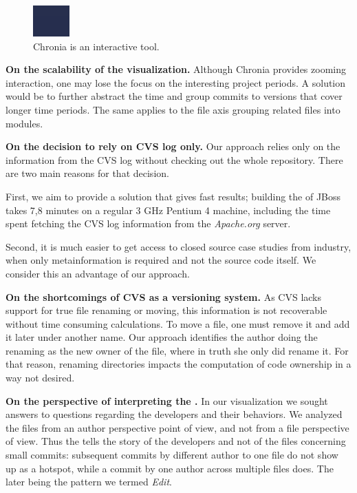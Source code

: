 \documentclass[10pt]{book}
\begin{document}
\begin{figure}[htbp]
\begin{center}
\includegraphics{chronia}
\caption{Chronia is an interactive tool.}
\label{fig:chronia}
\end{center}
\end{figure}

\textbf{On the scalability of the visualization.} Although Chronia provides zooming interaction, one may lose the focus on the interesting project periods. A solution would be to further abstract the time and group commits to versions that cover longer time periods. The same applies to the file axis grouping related files into modules.

\textbf{On the decision to rely on CVS log only.} Our approach relies only on the information from the CVS log without checking out the whole repository. There are two main reasons for that decision.

First, we aim to provide a solution that gives fast results; \eg building the \omap of JBoss takes 7,8 minutes on a regular 3 GHz Pentium 4 machine, including the time spent fetching the CVS log information from the \textit{Apache.org} server.

Second, it is much easier to get access to closed source case studies from industry, when only metainformation is required and not the source code itself. We consider this an advantage of our approach.

\textbf{On the shortcomings of CVS as a versioning system.} As CVS lacks support for true file renaming or moving, this information is not recoverable without time consuming calculations. To move a file, one must remove it and add it later under another name. Our approach identifies the author doing the renaming as the new owner of the file, where in truth she only did rename it. For that reason, renaming directories impacts the computation of code ownership in a way not desired.

\textbf{On the perspective of interpreting the \omap.} In our visualization we sought answers to questions regarding the developers and their behaviors. We analyzed the files from an author perspective point of view, and not from a file perspective of view. Thus the \omap tells the story of the developers and not of the files \eg concerning small commits: subsequent commits by different author to one file do not show up as a hotspot, while a commit by one author across multiple files does. The later being the pattern we termed \textit{Edit}.
\end{document}
